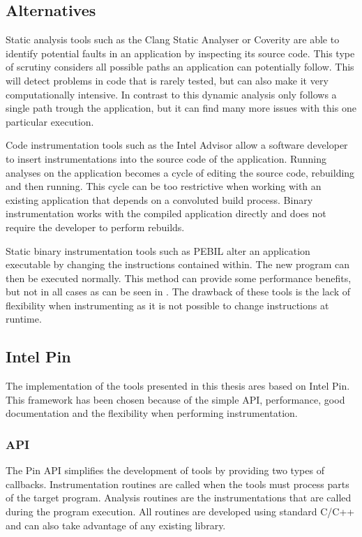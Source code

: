 \subsection{Alternatives}

Static analysis tools such as the Clang Static Analyser \cite{clang} or Coverity \cite{coverity} are able to identify potential faults in an application by inspecting its source code. This type of scrutiny considers all possible paths an application can potentially follow. This will detect problems in code that is rarely tested, but can also make it very computationally intensive. In contrast to this dynamic analysis only follows a single path trough the application, but it can find many more issues with this one particular execution.

Code instrumentation tools such as the Intel Advisor \cite{inteladvisor} allow a software developer to insert instrumentations into the source code of the application. Running analyses on the application becomes a cycle of editing the source code, rebuilding and then running. This cycle can be too restrictive when working with an existing application that depends on a convoluted build process. Binary instrumentation works with the compiled application directly and does not require the developer to perform rebuilds.

Static binary instrumentation tools such as PEBIL \cite{pebil} alter an application executable by changing the instructions contained within. The new program can then be executed normally. This method can provide some performance benefits, but not in all cases as can be seen in \cite{pebilperf}. The drawback of these tools is the lack of flexibility when instrumenting as it is not possible to change instructions at runtime.

\subsection{Intel Pin}

The implementation of the tools presented in this thesis ares based on Intel Pin. This framework has been chosen because of the simple API, performance, good documentation and the flexibility when performing instrumentation.

\subsubsection{API}

The Pin API \cite{pindoc} simplifies the development of tools by providing two types of callbacks. Instrumentation routines are called when the tools must process parts of the target program. Analysis routines are the instrumentations that are called during the program execution. All routines are developed using standard C/C++ and can also take advantage of any existing library.

